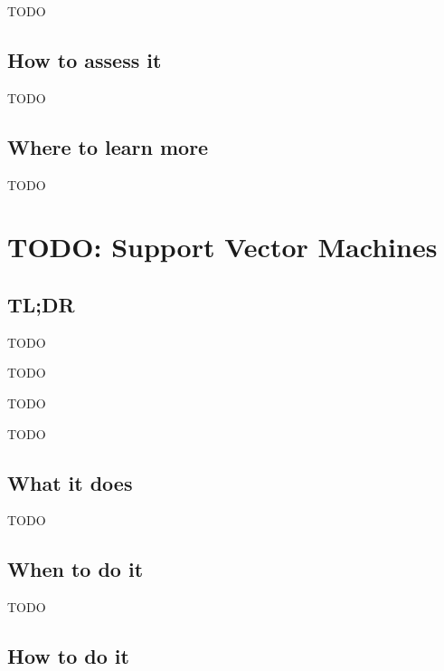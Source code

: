 \documentclass[
]{book}
\providecommand{\tightlist}{%
  \setlength{\itemsep}{0pt}\setlength{\parskip}{0pt}}
\begin{document}
TODO

\hypertarget{how-to-assess-it-18}{%
\section{How to assess it}\label{how-to-assess-it-18}}

TODO

\hypertarget{where-to-learn-more-18}{%
\section{Where to learn more}\label{where-to-learn-more-18}}

TODO

\hypertarget{support-vector-machines}{%
\chapter{TODO: Support Vector Machines}\label{support-vector-machines}}

\hypertarget{tldr-19}{%
\section{TL;DR}\label{tldr-19}}

\begin{description}
\tightlist
\item[What it does]
TODO
\item[When to do it]
TODO
\item[How to do it]
TODO
\item[How to assess it]
TODO
\end{description}

\hypertarget{what-it-does-19}{%
\section{What it does}\label{what-it-does-19}}

TODO

\hypertarget{when-to-do-it-19}{%
\section{When to do it}\label{when-to-do-it-19}}

TODO

\hypertarget{how-to-do-it-19}{%
\section{How to do it}\label{how-to-do-it-19}}
\end{document}
